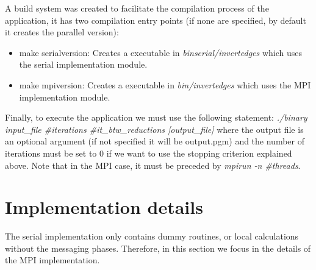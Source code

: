 \documentclass[12pt, a4paper, oneside]{article}
\begin{document}
A build system was created to facilitate the compilation process of the application, it has two compilation entry points
(if none are specified, by default it creates the parallel version):
\begin{itemize}
    \item make serialversion: Creates a executable in \emph{binserial/invertedges} which uses the serial implementation module.
    \item make mpiversion: Creates a executable in \emph{bin/invertedges} which uses the MPI implementation module.
\end{itemize}

Finally, to execute the application we must use the following statement:
\emph{./binary input\_file \#iterations \#it\_btw\_reductions [output\_file]}
where the output file is an optional argument (if not specified it will be output.pgm) and the number of iterations must be set to 0 if we want to use the stopping criterion explained above. 
Note that in the MPI case, it must be preceded by \emph{mpirun -n \#threads}.

\section{Implementation details}
The serial implementation only contains dummy routines, or local calculations without the messaging phases. Therefore, in this section we focus in the details of the MPI implementation.
\end{document}
